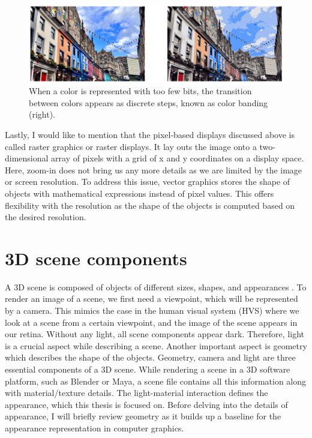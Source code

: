 \begin{figure}
  \centering
    \includegraphics[width=0.9\linewidth]{Images/color_quantization.png}

    \caption{When a color is represented with too few bits, the transition between colors appears as discrete steps, known as color banding (right).}\label{fig:color-band}
\end{figure} 



Lastly, I would like to mention that the pixel-based displays discussed above is called raster graphics or raster displays. It lay outs the image onto a two-dimensional array of pixels with a grid of x and y coordinates on a display space. Here, zoom-in does not bring us any more details as we are limited by the image or screen resolution. To address this issue, vector graphics stores the shape of objects with mathematical expressions instead of pixel values. This offers flexibility with the resolution as the shape of the objects is computed based on the desired resolution.

\section{3D scene components}

A 3D scene is composed of objects of different sizes, shapes, and appearances . To render an image of a scene, we first need a viewpoint, which will be represented by a camera. This mimics the case in the human visual system (HVS) where we look at a scene from a certain viewpoint, and the image of the scene appears in our retina. Without any light, all scene components appear dark. Therefore, light is a crucial aspect while describing a scene. Another important aspect is geometry which describes the shape of the objects. Geometry, camera and light are three essential components of a 3D scene. While rendering a scene in a 3D software platform, such as Blender or Maya, a scene file contains all this information along with material/texture details. The light-material interaction defines the appearance, which this thesis is focused on. Before delving into the details of appearance, I will briefly review geometry as it builds up a baseline for the appearance representation in computer graphics.

